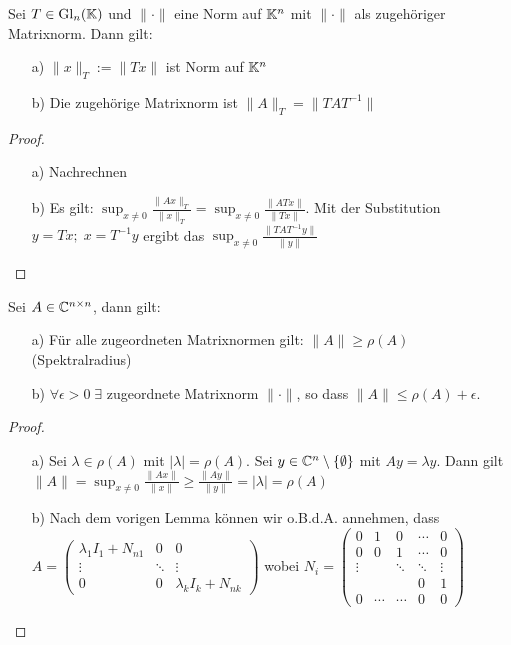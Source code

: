 \begin{Lemma}
  Sei $T \in \mathrm{Gl}_n(\mathbb K)$ und $\| \cdot \|$ eine Norm auf $\mathbb K^n$ mit $\| \cdot \|$
  als zugehöriger Matrixnorm. Dann gilt:
\begin{enumerate}
  \item[a)] $\|x\|_T := \|T x\|$ ist Norm auf $\mathbb K^n$
  \item[b)] Die zugehörige Matrixnorm ist $\|A\|_T = \|T A T^{-1}\|$
\end{enumerate}
\end{Lemma}
\begin{proof}
\quad \\
\begin{enumerate}
  \item[a)] Nachrechnen
  \item[b)] Es gilt: $\sup_{x \ne 0} \frac{\|A x\|_T}{\|x\|_T} =
  \sup_{x \ne 0} \frac{\|A T x\|}{\|T x\|}$. Mit der Substitution $y = T x; \; x = T^{-1} y$  ergibt das $\sup_{x \ne 0} \frac{\|T A T^{-1} y\|}{\|y\|}$
\end{enumerate}
\end{proof}

\begin{Lemma}
  Sei $A \in \mathbb C^{n \times n}$, dann gilt:
  \begin{enumerate}
  \item[a)] Für alle zugeordneten Matrixnormen gilt: $\|A\| \ge \rho(A)$ (Spektralradius)
  \item[b)] $\forall \epsilon > 0 \;\exists$ zugeordnete Matrixnorm $\| \cdot \|$, so dass
  $\|A\| \le \rho(A) + \epsilon$.
  \end{enumerate}
\end{Lemma}
\begin{proof}
\quad \\
\begin{enumerate}
  \item[a)] Sei $\lambda \in \rho(A)$ mit $|\lambda| = \rho(A)$. Sei $y \in \mathbb C^n \setminus \{\emptyset\}$ mit $A y = \lambda y$. Dann gilt $\|A\| = \sup_{x \ne 0} \frac{\|A x\|}{\|x\|}
  \ge \frac{\|A y\|}{\|y\|} = |\lambda| = \rho(A)$
    \item[b)] Nach dem vorigen Lemma können wir o.B.d.A. annehmen, dass \\
    $A =
    \begin{pmatrix}
      \lambda_1  I_1 + N_{n 1} & 0 & 0\\\vdots & \ddots & \vdots \\
      0 & 0 & \lambda_k  I_k + N_{n k}
    \end{pmatrix}$ wobei $N_i =
    \begin{pmatrix}
      0 & 1 & 0 & \cdots & 0\\
      0 & 0 & 1 & \cdots & 0\\
      \vdots &  & \ddots & \ddots &  \vdots\\
       &  &  & 0 & 1 \\
      0 & \cdots & \cdots  & 0 & 0
    \end{pmatrix}$
\end{enumerate}
\end{proof}
